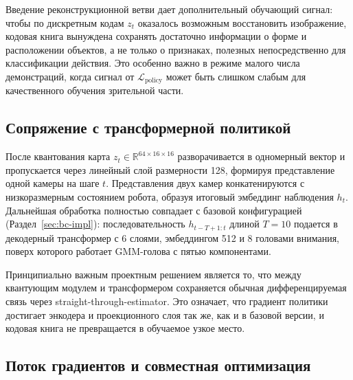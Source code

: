 Введение реконструкционной ветви дает дополнительный обучающий сигнал: чтобы по дискретным кодам $z_t$ оказалось возможным восстановить изображение, кодовая книга вынуждена сохранять достаточно информации о форме и расположении объектов, а не только о признаках, полезных непосредственно для классификации действия. Это особенно важно в режиме малого числа демонстраций, когда сигнал от $\mathcal{L}_{\text{policy}}$ может быть слишком слабым для качественного обучения зрительной части.

\subsection{Сопряжение с трансформерной политикой}
\label{subsec:vq-policy}

После квантования карта $z_t \in \mathbb{R}^{64 \times 16 \times 16}$ разворачивается в одномерный вектор и пропускается через линейный слой размерности 128, формируя представление одной камеры на шаге $t$. Представления двух камер конкатенируются с низкоразмерным состоянием робота, образуя итоговый эмбеддинг наблюдения $h_t$. Дальнейшая обработка полностью совпадает с базовой конфигурацией (Раздел~\ref{sec:bc-impl}): последовательность $h_{t-T+1:t}$ длиной $T = 10$ подается в декодерный трансформер с 6 слоями, эмбеддингом 512 и 8 головами внимания, поверх которого работает GMM-голова с пятью компонентами.

Принципиально важным проектным решением является то, что между квантующим модулем и трансформером сохраняется обычная дифференцируемая связь через straight-through-estimator. Это означает, что градиент политики достигает энкодера и проекционного слоя так же, как и в базовой версии, и кодовая книга не превращается в обучаемое узкое место.

\subsection{Поток градиентов и совместная оптимизация}
\label{subsec:vq-grad}

